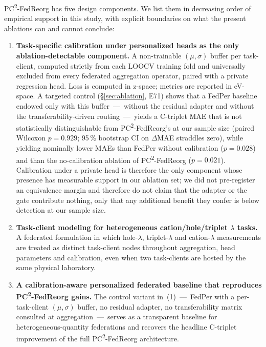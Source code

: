 \documentclass[11pt,a4paper]{article}
\newcommand{\PC}{PC\textsuperscript{2}-FedReorg}
\begin{document}
\PC{} has five design components. We list them in decreasing order of empirical support in this study, with explicit boundaries on what the present ablations can and cannot conclude:
\begin{enumerate}
  \item \textbf{Task-specific calibration under personalized heads as the only ablation-detectable component.} A non-trainable $(\mu, \sigma)$ buffer per task-client, computed strictly from each LOOCV training fold and universally excluded from every federated aggregation operator, paired with a private regression head. Loss is computed in z-space; metrics are reported in eV-space. A targeted control (\S\ref{sec:ablation}, E71) shows that a FedPer baseline endowed only with this buffer~---~without the residual adapter and without the transferability-driven routing~---~yields a C-triplet MAE that is not statistically distinguishable from \PC{}'s at our sample size (paired Wilcoxon $p = 0.929$; 95\,\% bootstrap CI on $\Delta$MAE straddles zero), while yielding nominally lower MAEs than FedPer without calibration ($p = 0.028$) and than the no-calibration ablation of \PC{} ($p = 0.021$). Calibration under a private head is therefore the only component whose presence has measurable support in our ablation set; we did not pre-register an equivalence margin and therefore do not claim that the adapter or the gate contribute nothing, only that any additional benefit they confer is below detection at our sample size.
  \item \textbf{Task-client modeling for heterogeneous cation/hole/triplet $\lambda$ tasks.} A federated formulation in which hole-$\lambda$, triplet-$\lambda$ and cation-$\lambda$ measurements are treated as distinct task-client nodes throughout aggregation, head parameters and calibration, even when two task-clients are hosted by the same physical laboratory.
  \item \textbf{A calibration-aware personalized federated baseline that reproduces \PC{} gains.} The control variant in~(1)~---~FedPer with a per-task-client $(\mu, \sigma)$ buffer, no residual adapter, no transferability matrix consulted at aggregation~---~serves as a transparent baseline for heterogeneous-quantity federations and recovers the headline C-triplet improvement of the full \PC{} architecture.

\end{enumerate}
\end{document}
